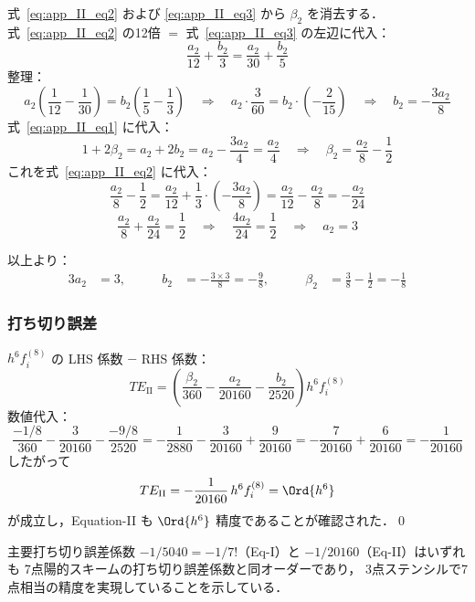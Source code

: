 式~\eqref{eq:app_II_eq2} および \eqref{eq:app_II_eq3} から $\beta_2$ を消去する．
式~\eqref{eq:app_II_eq2} の12倍 $=$ 式~\eqref{eq:app_II_eq3} の左辺に代入：
\[
  \frac{a_2}{12} + \frac{b_2}{3} = \frac{a_2}{30} + \frac{b_2}{5}
\]
整理：
\[
  a_2\!\left(\frac{1}{12}-\frac{1}{30}\right) = b_2\!\left(\frac{1}{5}-\frac{1}{3}\right)
  \quad\Longrightarrow\quad
  a_2\cdot\frac{3}{60} = b_2\cdot\!\left(-\frac{2}{15}\right)
  \quad\Longrightarrow\quad
  b_2 = -\frac{3a_2}{8}
\]
式~\eqref{eq:app_II_eq1} に代入：
\[
  1 + 2\beta_2 = a_2 + 2b_2 = a_2 - \frac{3a_2}{4} = \frac{a_2}{4}
  \quad\Longrightarrow\quad
  \beta_2 = \frac{a_2}{8} - \frac{1}{2}
\]
これを式~\eqref{eq:app_II_eq2} に代入：
\[
  \frac{a_2}{8} - \frac{1}{2} = \frac{a_2}{12} + \frac{1}{3}\cdot\!\left(-\frac{3a_2}{8}\right)
  = \frac{a_2}{12} - \frac{a_2}{8}
  = -\frac{a_2}{24}
\]
\[
  \frac{a_2}{8} + \frac{a_2}{24} = \frac{1}{2}
  \quad\Longrightarrow\quad
  \frac{4a_2}{24} = \frac{1}{2}
  \quad\Longrightarrow\quad
  a_2 = 3
\]

以上より：
\begin{alignat}{3}
  a_2 &= 3, \qquad
  &b_2 &= -\frac{3\times3}{8} = -\frac{9}{8}, \qquad
  &\beta_2 &= \frac{3}{8} - \frac{1}{2} = -\frac{1}{8}
\end{alignat}

\subsubsection*{打ち切り誤差}

$h^6 f^{(8)}_i$ の LHS 係数 $-$ RHS 係数：
\[
  TE_{\mathrm{II}} = \left(\frac{\beta_2}{360} - \frac{a_2}{20160} - \frac{b_2}{2520}\right)h^6 f^{(8)}_i
\]
数値代入：
\[
  \frac{-1/8}{360} - \frac{3}{20160} - \frac{-9/8}{2520}
  = -\frac{1}{2880} - \frac{3}{20160} + \frac{9}{20160}
  = -\frac{7}{20160} + \frac{6}{20160}
  = -\frac{1}{20160}
\]
したがって
\[
  TE_{\mathrm{II}} = -\frac{1}{20160}\,h^6 f^{(8)}_i = \Ord{h^6}
\]
が成立し，Equation-II も $\Ord{h^6}$ 精度であることが確認された．\qed

\medskip
\noindent
主要打ち切り誤差係数 $-1/5040 = -1/7!$（Eq-I）と $-1/20160$（Eq-II）はいずれも
7点陽的スキームの打ち切り誤差係数と同オーダーであり，
3点ステンシルで7点相当の精度を実現していることを示している．

